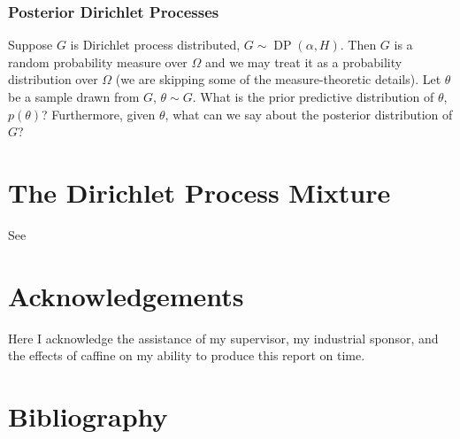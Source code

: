 \documentclass[final,3p,times,twocolumn]{elsarticle}
\DeclareMathOperator*{\DP}{DP}
\begin{document}
\subsubsection*{\normalfont \small \bfseries Posterior Dirichlet Processes}
Suppose $G$ is Dirichlet process distributed, $G \sim \DP(\alpha,H)$.
Then $G$ is a random probability measure over $\Omega$ and we may treat it as a probability distribution over $\Omega$ (we are skipping some of the measure-theoretic details).
Let $\theta$ be a sample drawn from $G$, $\theta \sim G$.
What is the prior predictive distribution of $\theta$, $p(\theta)$? Furthermore, given $\theta$, what can we say about the posterior distribution of $G$?



\section{The Dirichlet Process Mixture}
\label{sect:DPM}

See \cite{Murphy}

\section*{Acknowledgements}
Here I acknowledge the assistance of my supervisor, my industrial sponsor,
and the effects of caffine on my ability to produce this report on time.

\appendix


\section*{Bibliography}








\end{document}
